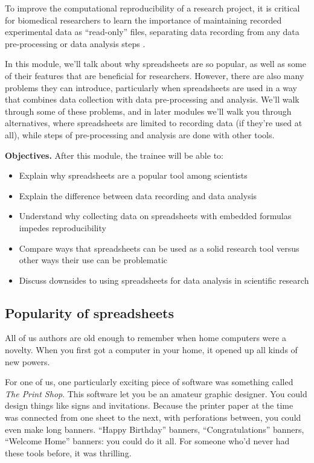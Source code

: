 \documentclass[]{tufte-book}
\providecommand{\tightlist}{%
  \setlength{\itemsep}{0pt}\setlength{\parskip}{0pt}}
\begin{document}
To improve the computational reproducibility of a research project, it is
critical for biomedical researchers to learn the importance of maintaining
recorded experimental data as ``read-only'' files, separating data recording from
any data pre-processing or data analysis steps \citep{broman2018data, marwick2018packaging}.

In this module, we'll talk about why spreadsheets are so popular, as well
as some of their features that are beneficial for researchers. However, there
are also many problems they can introduce, particularly when spreadsheets are
used in a way that combines data collection with data pre-processing and analysis.
We'll walk through some of these problems, and in later modules we'll walk you
through alternatives, where spreadsheets are limited to recording data (if they're
used at all), while steps of pre-processing and analysis are done with other
tools.

\textbf{Objectives.} After this module, the trainee will be able to:

\begin{itemize}
\tightlist
\item
  Explain why spreadsheets are a popular tool among scientists
\item
  Explain the difference between data recording and data analysis
\item
  Understand why collecting data on spreadsheets with embedded formulas impedes
  reproducibility
\item
  Compare ways that spreadsheets can be used as a solid research tool
  versus other ways their use can be problematic
\item
  Discuss downsides to using spreadsheets for data analysis in scientific
  research
\end{itemize}

\subsection{Popularity of spreadsheets}\label{popularity-of-spreadsheets}

All of us authors are old enough to remember when home computers were a novelty.
When you first got a computer in your home, it opened up all kinds of new powers.

For one of us, one particularly exciting piece of software was something called
\emph{The Print Shop}. This software let you be an amateur graphic designer. You could
design things like signs and invitations. Because the printer paper at the time
was connected from one sheet to the next, with perforations between, you could
even make long banners. ``Happy Birthday'' banners, ``Congratulations'' banners,
``Welcome Home'' banners: you could do it all. For someone who'd never had these
tools before, it was thrilling.
\end{document}
